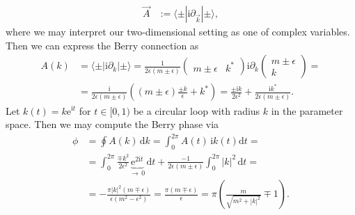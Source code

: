 \documentclass[english, parskip=full]{scrartcl}
\newcommand{\braket}{}
\newcommand{\intx}{}
\newcommand{\kla}{}
\newcommand{\tecxt}{}
\renewcommand{\i}{\text{i}}
\newcommand{\e}{\text{e}}
\begin{document}
\begin{align}
\vec{A} &:= \braket\langle \pm | \i\partial_{\vec{k}} | \pm \rangle,
\end{align}
where we may interpret our two-dimensional setting as one of complex variables.
Then we can express the Berry connection as
\begin{align}
A(k) &= \braket\langle \pm | \i\partial_k | \pm \rangle = \frac{1}{2\epsilon (m\pm \epsilon)} \begin{pmatrix}
m\pm\epsilon & k^\ast
\end{pmatrix} \i\partial_{k} \begin{pmatrix}
m\pm\epsilon \\ k
\end{pmatrix} = \\
&= \frac{\i }{2\epsilon (m\pm \epsilon)}\kla\left( (m\pm \epsilon)\frac{\pm k}{\epsilon} +  k^\ast \right) = \frac{\pm\i k}{2\epsilon^2} + \frac{\i k^\ast}{2\epsilon (m\pm\epsilon)}.
\end{align}
Let $k(t)=k\e^{\i t}$ for $t\in[0,1)$ be a circular loop with radius $k$ in the parameter space. 
Then we may compute the Berry phase via
\begin{align}
\phi &= \oint A(k)\,\tecxt\text{d}k = \intx\int_{0}^{2\pi} A(t) \,\i k(t) \mathrm{d}t = \\
&= \intx\int_{0}^{2\pi}\frac{\mp k^2}{2\epsilon^2} \underbrace{\e^{2\i t}}_{\rightarrow\, 0}\, \mathrm{d}t +  \frac{-1}{2\epsilon (m\pm \epsilon)}\intx\int_{0}^{2\pi} |k|^2\, \mathrm{d}t = \\
&= -\frac{\pi |k|^2 (m\mp \epsilon)}{\epsilon (m^2 - \epsilon^2)} = \frac{\pi (m\mp \epsilon)}{\epsilon} = \pi \kla\left( \frac{m}{\sqrt{m^2 + |k|^2}} \mp 1 \right).
\end{align}
\end{document}
